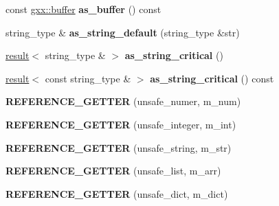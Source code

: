 \begin{DoxyCompactItemize}
\item 
const \hyperlink{classgxx_1_1buffer}{gxx\+::buffer} {\bfseries as\+\_\+buffer} () const \hypertarget{classgxx_1_1trent_a0301a42a1d84cf081585272ddcccc6b8}{}\label{classgxx_1_1trent_a0301a42a1d84cf081585272ddcccc6b8}

\item 
string\+\_\+type \& {\bfseries as\+\_\+string\+\_\+default} (string\+\_\+type \&str)\hypertarget{classgxx_1_1trent_a9c4a8ee33b94759120c010eb676ae4e6}{}\label{classgxx_1_1trent_a9c4a8ee33b94759120c010eb676ae4e6}

\item 
\hyperlink{classgxx_1_1result__type_1_1result}{result}$<$ string\+\_\+type \& $>$ {\bfseries as\+\_\+string\+\_\+critical} ()\hypertarget{classgxx_1_1trent_a03d756d19d3c6063f125f62e2ee2be4f}{}\label{classgxx_1_1trent_a03d756d19d3c6063f125f62e2ee2be4f}

\item 
\hyperlink{classgxx_1_1result__type_1_1result}{result}$<$ const string\+\_\+type \& $>$ {\bfseries as\+\_\+string\+\_\+critical} () const \hypertarget{classgxx_1_1trent_a245516b8a162c284a6140f8d0bcd3f47}{}\label{classgxx_1_1trent_a245516b8a162c284a6140f8d0bcd3f47}

\item 
{\bfseries R\+E\+F\+E\+R\+E\+N\+C\+E\+\_\+\+G\+E\+T\+T\+ER} (unsafe\+\_\+numer, m\+\_\+num)\hypertarget{classgxx_1_1trent_a63887f489ae746f332420bd0302470ca}{}\label{classgxx_1_1trent_a63887f489ae746f332420bd0302470ca}

\item 
{\bfseries R\+E\+F\+E\+R\+E\+N\+C\+E\+\_\+\+G\+E\+T\+T\+ER} (unsafe\+\_\+integer, m\+\_\+int)\hypertarget{classgxx_1_1trent_a7b0ea3910ae3022715a19a34a8e41895}{}\label{classgxx_1_1trent_a7b0ea3910ae3022715a19a34a8e41895}

\item 
{\bfseries R\+E\+F\+E\+R\+E\+N\+C\+E\+\_\+\+G\+E\+T\+T\+ER} (unsafe\+\_\+string, m\+\_\+str)\hypertarget{classgxx_1_1trent_a18b09d9f7876fd8d4efcbcb78415c16f}{}\label{classgxx_1_1trent_a18b09d9f7876fd8d4efcbcb78415c16f}

\item 
{\bfseries R\+E\+F\+E\+R\+E\+N\+C\+E\+\_\+\+G\+E\+T\+T\+ER} (unsafe\+\_\+list, m\+\_\+arr)\hypertarget{classgxx_1_1trent_adf2e850b367fbdb00aff4257934b767c}{}\label{classgxx_1_1trent_adf2e850b367fbdb00aff4257934b767c}

\item 
{\bfseries R\+E\+F\+E\+R\+E\+N\+C\+E\+\_\+\+G\+E\+T\+T\+ER} (unsafe\+\_\+dict, m\+\_\+dict)\hypertarget{classgxx_1_1trent_ad6ebc1b5e0ac75231264e3a7f0b7a8c4}{}\label{classgxx_1_1trent_ad6ebc1b5e0ac75231264e3a7f0b7a8c4}


\end{DoxyCompactItemize}
